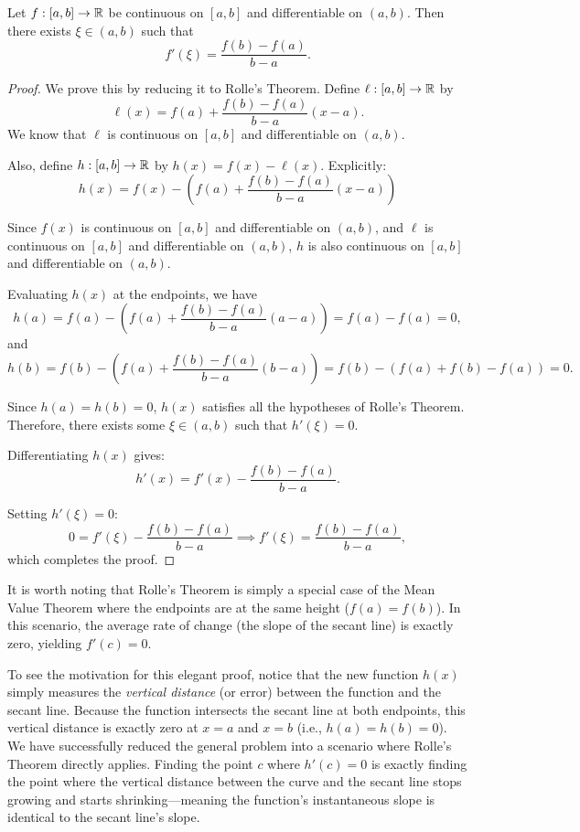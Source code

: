 \documentclass[../analysis1.tex]{subfiles}
\begin{document}
\begin{theorem}
\label{thm:mvt}
    \begin{shaded*}
        Let $f:[a,b]\to\mathbb{R}$ be continuous on $[a,b]$ and differentiable on $(a,b)$. Then there exists $\xi\in(a,b)$ such that
        \[f'(\xi)=\frac{f(b)-f(a)}{b-a}.\]
    \end{shaded*}
\end{theorem}
\begin{proof}
    We prove this by reducing it to Rolle's Theorem. Define $\ell:[a,b]\to\mathbb{R}$ by
    \[ \ell(x) = f(a) + \frac{f(b) - f(a)}{b - a}(x - a). \]
    We know that $\ell$ is continuous on $[a,b]$ and differentiable on $(a,b)$.

    Also, define $h:[a,b]\to\mathbb{R}$ by $h(x) = f(x) - \ell(x)$. Explicitly:
    \[ h(x) = f(x) - \left( f(a) + \frac{f(b) - f(a)}{b - a}(x - a) \right) \]
    
    Since $f(x)$ is continuous on $[a,b]$ and differentiable on $(a,b)$, and $\ell$ is continuous on $[a,b]$ and differentiable on $(a,b)$, $h$ is also continuous on $[a,b]$ and differentiable on $(a,b)$.
    
    Evaluating $h(x)$ at the endpoints, we have
    \[ h(a) = f(a) - \left( f(a) + \frac{f(b) - f(a)}{b - a}(a - a) \right) = f(a) - f(a) = 0, \]
    and
    \[ h(b) = f(b) - \left( f(a) + \frac{f(b) - f(a)}{b - a}(b - a) \right) = f(b) - (f(a) + f(b) - f(a)) = 0. \]
    
    Since $h(a) = h(b) = 0$, $h(x)$ satisfies all the hypotheses of Rolle's Theorem. Therefore, there exists some $\xi \in (a,b)$ such that $h'(\xi) = 0$.
    
    Differentiating $h(x)$ gives:
    \[ h'(x) = f'(x) - \frac{f(b) - f(a)}{b - a}. \]
    
    Setting $h'(\xi) = 0$:
    \[ 0 = f'(\xi) - \frac{f(b) - f(a)}{b - a} \implies f'(\xi) = \frac{f(b) - f(a)}{b - a}, \]
    which completes the proof.
\end{proof}

It is worth noting that Rolle's Theorem is simply a special case of the Mean Value Theorem where the endpoints are at the same height ($f(a) = f(b)$). In this scenario, the average rate of change (the slope of the secant line) is exactly zero, yielding $f'(c) = 0$.

To see the motivation for this elegant proof, notice that the new function $h(x)$ simply measures the \textit{vertical distance} (or error) between the function and the secant line. Because the function intersects the secant line at both endpoints, this vertical distance is exactly zero at $x=a$ and $x=b$ (i.e., $h(a) = h(b) = 0$). We have successfully reduced the general problem into a scenario where Rolle's Theorem directly applies. Finding the point $c$ where $h'(c) = 0$ is exactly finding the point where the vertical distance between the curve and the secant line stops growing and starts shrinking—meaning the function's instantaneous slope is identical to the secant line's slope.
\end{document}
